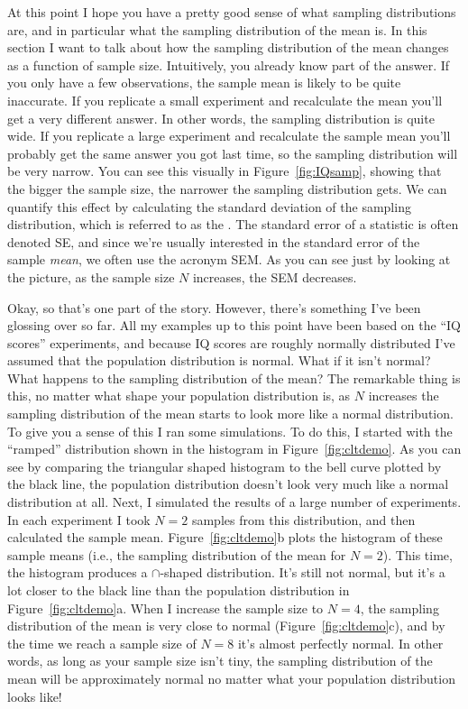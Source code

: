 At this point I hope you have a pretty good sense of what sampling distributions are, and in particular what the sampling distribution of the mean is. In this section I want to talk about how the sampling distribution of the mean changes as a function of sample size. Intuitively, you already know part of the answer. If you only have a few observations, the sample mean is likely to be quite inaccurate. If you replicate a small experiment and recalculate the mean you'll get a very different answer. In other words, the sampling distribution is quite wide. If you replicate a large experiment and recalculate the sample mean you'll probably get the same answer you got last time, so the sampling distribution will be very narrow. You can see this visually in Figure~\ref{fig:IQsamp}, showing that the bigger the sample size, the narrower the sampling distribution gets. We can quantify this effect by calculating the standard deviation of the sampling distribution, which is referred to as the . The standard error of a statistic is often denoted SE, and since we're usually interested in the standard error of the sample {\it mean}, we often use the acronym SEM. As you can see just by looking at the picture, as the sample size $N$ increases, the SEM decreases.  

Okay, so that's one part of the story. However, there's something I've been glossing over so far. All my examples up to this point have been based on the ``IQ scores'' experiments, and because IQ scores are roughly normally distributed I've assumed that the population distribution is normal. What if it isn't normal? What happens to the sampling distribution of the mean? The remarkable thing is this, no matter what shape your population distribution is, as $N$ increases the sampling distribution of the mean starts to look more like a normal distribution. To give you a sense of this I ran some simulations. To do this, I started with the ``ramped'' distribution shown in the histogram in Figure~\ref{fig:cltdemo}. As you can see by comparing the triangular shaped histogram to the bell curve plotted by the black line, the population distribution doesn't look very much like a normal distribution at all. Next, I simulated the results of a large number of experiments. In each experiment I took $N=2$ samples from this distribution, and then calculated the sample mean. Figure~\ref{fig:cltdemo}b plots the histogram of these sample means (i.e., the sampling distribution of the mean for $N=2$). This time, the histogram produces a $\cap$-shaped distribution. It's still not normal, but it's a lot closer to the black line than the population distribution in Figure~\ref{fig:cltdemo}a. When I increase the sample size to $N=4$, the sampling distribution of the mean is very close to normal (Figure~\ref{fig:cltdemo}c), and by the time we reach a sample size of $N=8$ it's almost perfectly normal. In other words, as long as your sample size isn't tiny, the sampling distribution of the mean will be approximately normal no matter what your population distribution looks like!

